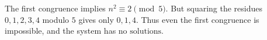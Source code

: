 The first congruence implies $n^2\equiv 2\pmod 5$. But squaring the residues $0,1,2,3,4$ modulo $5$ gives only $0,1,4$. Thus even the first congruence is impossible, and the system has $\boxed{\text{no solutions}}$.
